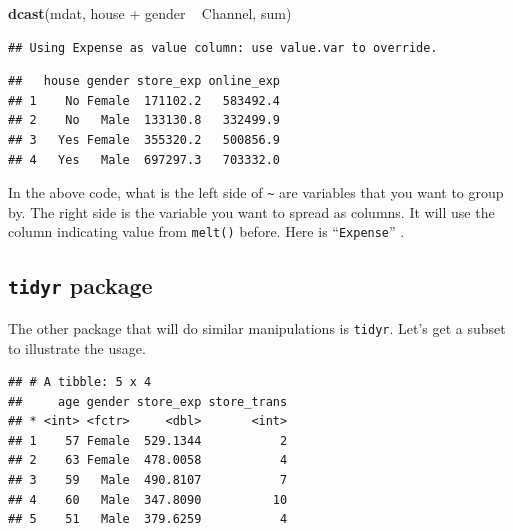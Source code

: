 \documentclass[]{book}
\newenvironment{Shaded}{\begin{snugshade}}{\end{snugshade}}
\newcommand{\KeywordTok}[1]{\textcolor[rgb]{0.13,0.29,0.53}{\textbf{{#1}}}}
\newcommand{\DecValTok}[1]{\textcolor[rgb]{0.00,0.00,0.81}{{#1}}}
\newcommand{\StringTok}[1]{\textcolor[rgb]{0.31,0.60,0.02}{{#1}}}
\newcommand{\CommentTok}[1]{\textcolor[rgb]{0.56,0.35,0.01}{\textit{{#1}}}}
\newcommand{\NormalTok}[1]{{#1}}
\theoremstyle{definition}
\theoremstyle{definition}
\theoremstyle{remark}
\begin{document}
\begin{Shaded}
\begin{Highlighting}[]
\KeywordTok{dcast}\NormalTok{(mdat, house +}\StringTok{ }\NormalTok{gender ~}\StringTok{ }\NormalTok{Channel, sum)}
\end{Highlighting}
\end{Shaded}

\begin{verbatim}
## Using Expense as value column: use value.var to override.
\end{verbatim}

\begin{verbatim}
##   house gender store_exp online_exp
## 1    No Female  171102.2   583492.4
## 2    No   Male  133130.8   332499.9
## 3   Yes Female  355320.2   500856.9
## 4   Yes   Male  697297.3   703332.0
\end{verbatim}

In the above code, what is the left side of \texttt{\textasciitilde{}}
are variables that you want to group by. The right side is the variable
you want to spread as columns. It will use the column indicating value
from \texttt{melt()} before. Here is ``\texttt{Expense}'' .

\subsection{\texorpdfstring{\texttt{tidyr}
package}{tidyr package}}\label{tidyr-package}

The other package that will do similar manipulations is \texttt{tidyr}.
Let's get a subset to illustrate the usage.

\begin{Shaded}
\end{Shaded}

\begin{verbatim}
## # A tibble: 5 x 4
##     age gender store_exp store_trans
## * <int> <fctr>     <dbl>       <int>
## 1    57 Female  529.1344           2
## 2    63 Female  478.0058           4
## 3    59   Male  490.8107           7
## 4    60   Male  347.8090          10
## 5    51   Male  379.6259           4
\end{verbatim}
\end{document}
